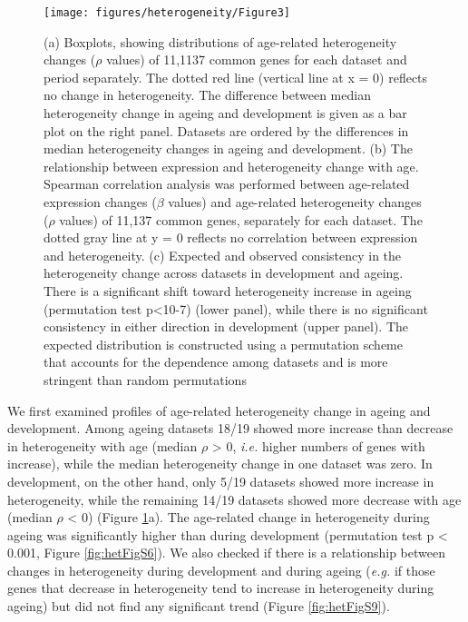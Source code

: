 \documentclass[12pt,twoside]{unicam}
\begin{document}
\begin{figure}

{\centering \texttt{[image: figures/heterogeneity/Figure3]} 

}

\caption[a) Distributions of age-related changes in gene expression heterogeneity across datasets, b) The relationship between the age-related change in gene expression level and heterogeneity, c) Consistency in the change in gene expression heterogeneity.]{(a) Boxplots, showing distributions of age-related heterogeneity changes ($\rho$ values) of 11,1137 common genes for each dataset and period separately. The dotted red line (vertical line at x = 0) reflects no change in heterogeneity. The difference between median heterogeneity change in ageing and development is given as a bar plot on the right panel. Datasets are ordered by the differences in median heterogeneity changes in ageing and development. (b) The relationship between expression and heterogeneity change with age. Spearman correlation analysis was performed between age-related expression changes ($\beta$ values) and age-related heterogeneity changes ($\rho$ values) of 11,137 common genes, separately for each dataset. The dotted gray line at y = 0 reflects no correlation between expression and heterogeneity. (c) Expected and observed consistency in the heterogeneity change across datasets in development and ageing. There is a significant shift toward heterogeneity increase in ageing (permutation test p<10-7) (lower panel), while there is no significant consistency in either direction in development (upper panel). The expected distribution is constructed using a permutation scheme that accounts for the dependence among datasets and is more stringent than random permutations}\label{fig:hetFig3}
\end{figure}

We first examined profiles of age-related heterogeneity change in ageing and development. Among ageing datasets 18/19 showed more increase than decrease in heterogeneity with age (median \(\rho\) \textgreater{} 0, \emph{i.e.} higher numbers of genes with increase), while the median heterogeneity change in one dataset was zero. In development, on the other hand, only 5/19 datasets showed more increase in heterogeneity, while the remaining 14/19 datasets showed more decrease with age (median \(\rho\) \textless{} 0) (Figure \ref{fig:hetFig3}a). The age-related change in heterogeneity during ageing was significantly higher than during development (permutation test p \textless{} 0.001, Figure \ref{fig:hetFigS6}). We also checked if there is a relationship between changes in heterogeneity during development and during ageing (\emph{e.g.} if those genes that decrease in heterogeneity tend to increase in heterogeneity during ageing) but did not find any significant trend (Figure \ref{fig:hetFigS9}).
\end{document}
